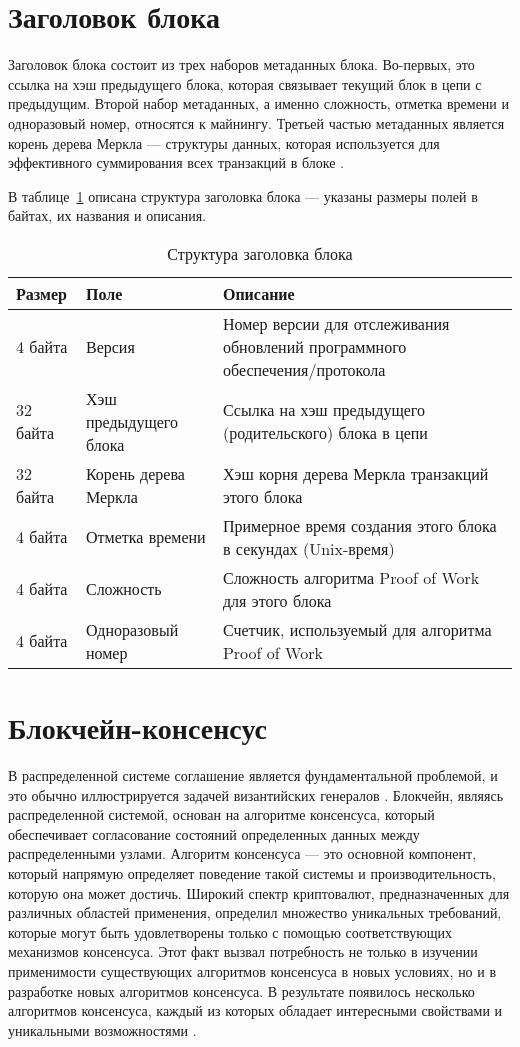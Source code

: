 \documentclass{bmstu}
\begin{document}
\section{Заголовок блока}

Заголовок блока состоит из трех наборов метаданных блока. Во-первых, это ссылка на хэш предыдущего блока, которая связывает текущий блок в цепи с предыдущим. Второй набор метаданных, а именно сложность, отметка времени и одноразовый номер, относятся к майнингу. Третьей частью метаданных является корень дерева Меркла --- структуры данных, которая используется для эффективного суммирования всех транзакций в блоке \cite[165]{Antonopoulos2010}.

В таблице~\ref{tabular:headerstructure} описана структура заголовка блока --- указаны размеры полей в байтах, их названия и описания.

\begin{table}[H]
\caption{Структура заголовка блока}
\label{tabular:headerstructure}
\begin{tabular}{|p{3.5cm}|p{4.5cm}|p{7cm}|}
\hline
\textbf{Размер} & \textbf{Поле} & \textbf{Описание}
\tabularnewline
\hline
4 байта & Версия & Номер версии для отслеживания обновлений программного обеспечения/протокола
\tabularnewline
\hline
32 байта & Хэш предыдущего блока & Ссылка на хэш предыдущего (родительского) блока в цепи
\tabularnewline
\hline
32 байта & Корень дерева Меркла & Хэш корня дерева Меркла транзакций этого блока
\tabularnewline
\hline
4 байта & Отметка времени & Примерное время создания этого блока в секундах (Unix-время)
\tabularnewline
\hline
4 байта & Сложность & Сложность алгоритма Proof of Work для этого блока
\tabularnewline
\hline
4 байта & Одноразовый номер & Счетчик, используемый для алгоритма Proof of Work
\tabularnewline
\hline
\end{tabular}
\end{table}

\section{Блокчейн-консенсус}

В распределенной системе соглашение является фундаментальной проблемой, и это обычно иллюстрируется задачей византийских генералов \cite{Lamport1982}. 
Блокчейн, являясь распределенной системой, основан на алгоритме консенсуса, который обеспечивает согласование состояний определенных данных между распределенными узлами. 
Алгоритм консенсуса --- это основной компонент, который напрямую определяет поведение такой системы и производительность, которую она может достичь. 
Широкий спектр криптовалют, предназначенных для различных областей применения, определил множество уникальных требований, которые могут быть удовлетворены только с помощью соответствующих механизмов консенсуса. 
Этот факт вызвал потребность не только в изучении применимости существующих алгоритмов консенсуса в новых условиях, но и в разработке новых алгоритмов консенсуса. 
В результате появилось несколько алгоритмов консенсуса, каждый из которых обладает интересными свойствами и уникальными возможностями \cite{Sadek2020}.
\end{document}
